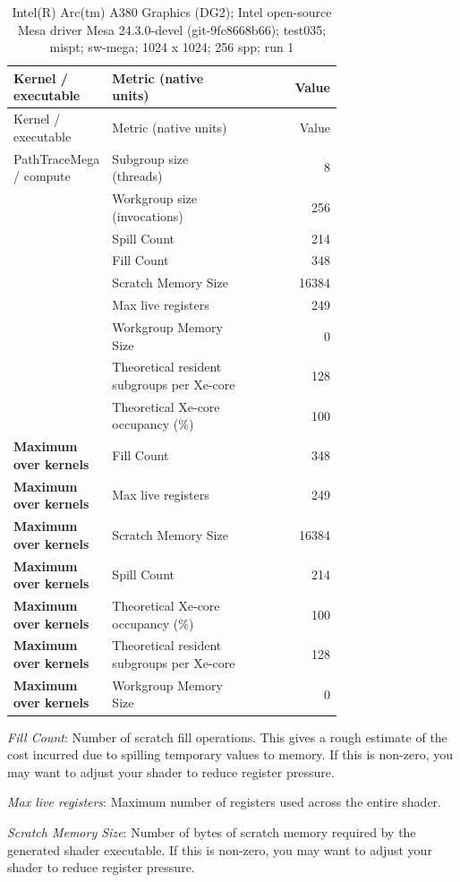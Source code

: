 \begin{longtable}{p{0.30\linewidth}p{0.43\linewidth}r}
\caption{Intel(R) Arc(tm) A380 Graphics (DG2); Intel open-source Mesa driver Mesa 24.3.0-devel (git-9fc8668b66); test035; mispt; sw-mega; 1024 x 1024; 256 spp; run 1}\label{tab:hydra-profile-3}\\
\hline Kernel / executable & Metric (native units) & Value \\\hline
\endfirsthead
\hline Kernel / executable & Metric (native units) & Value \\\hline
\endhead
PathTraceMega / compute & Subgroup size (threads) & 8 \\
 & Workgroup size (invocations) & 256 \\
 & Spill Count & 214 \\
 & Fill Count & 348 \\
 & Scratch Memory Size & 16384 \\
 & Max live registers & 249 \\
 & Workgroup Memory Size & 0 \\
 & Theoretical resident subgroups per Xe-core & 128 \\
 & Theoretical Xe-core occupancy (\%) & 100 \\
\hline
\textbf{Maximum over kernels} & Fill Count & 348 \\
\textbf{Maximum over kernels} & Max live registers & 249 \\
\textbf{Maximum over kernels} & Scratch Memory Size & 16384 \\
\textbf{Maximum over kernels} & Spill Count & 214 \\
\textbf{Maximum over kernels} & Theoretical Xe-core occupancy (\%) & 100 \\
\textbf{Maximum over kernels} & Theoretical resident subgroups per Xe-core & 128 \\
\textbf{Maximum over kernels} & Workgroup Memory Size & 0 \\
\hline
\end{longtable}
\noindent\textit{Fill Count}: Number of scratch fill operations.  This gives a rough estimate of the cost incurred due to spilling temporary values to memory.  If this is non-zero, you may want to adjust your shader to reduce register pressure.\par
\noindent\textit{Max live registers}: Maximum number of registers used across the entire shader.\par
\noindent\textit{Scratch Memory Size}: Number of bytes of scratch memory required by the generated shader executable.  If this is non-zero, you may want to adjust your shader to reduce register pressure.\par
